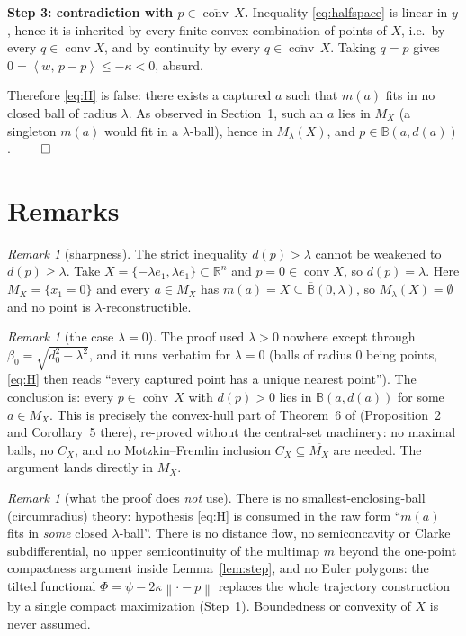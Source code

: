 \documentclass[11pt]{article}
\theoremstyle{remark}
\newtheorem{remark}[theorem]{Remark}
\newcommand{\R}{\mathbb{R}}
\newcommand{\B}{\mathbb{B}}
\newcommand{\X}{X}
\newcommand{\conv}{\operatorname{conv}}
\newcommand{\cconv}[1]{\overline{\conv}\,#1}
\newcommand{\sca}[2]{\left\langle #1,\, #2\right\rangle}
\newcommand{\norm}[1]{\left\lVert #1\right\rVert}
\newcommand{\Mx}{M_{\X}}
\newcommand{\Cx}{C_{\X}}
\newcommand{\Ml}{M_{\lambda}(\X)}
\newcommand{\Bcl}[2]{\overline{\B}(#1,#2)}
\begin{document}
\medskip
\noindent\textbf{Step 3: contradiction with $p\in\cconv\X$.}
Inequality \eqref{eq:halfspace} is linear in $y$, hence it is inherited by every finite convex
combination of points of $\X$, i.e.\ by every $q\in\conv\X$, and by continuity by every
$q\in\cconv\X$. Taking $q=p$ gives $0=\sca{w}{p-p}\le-\kappa<0$, absurd.

\medskip
Therefore \eqref{eq:H} is false: there exists a captured $a$ such that $m(a)$ fits in no closed
ball of radius $\lambda$. As observed in Section~1, such an $a$ lies in $\Mx$ (a singleton
$m(a)$ would fit in a $\lambda$-ball), hence in $\Ml$, and $p\in\B(a,d(a))$.
\hfill$\qed$

\section{Remarks}

\begin{remark}[sharpness]\label{rem:sharp}
The strict inequality $d(p)>\lambda$ cannot be weakened to $d(p)\ge\lambda$. Take
$\X=\{-\lambda e_1,\lambda e_1\}\subset\R^n$ and $p=0\in\conv\X$, so $d(p)=\lambda$. Here
$\Mx=\{x_1=0\}$ and every $a\in\Mx$ has $m(a)=\X\subseteq\Bcl{0}{\lambda}$, so
$\Ml=\emptyset$ and no point is $\lambda$-reconstructible.
\end{remark}

\begin{remark}[the case $\lambda=0$]
The proof used $\lambda>0$ nowhere except through $\beta_0=\sqrt{d_0^2-\lambda^2}$, and it runs
verbatim for $\lambda=0$ (balls of radius $0$ being points, \eqref{eq:H} then reads ``every
captured point has a unique nearest point''). The conclusion is: every $p\in\cconv\X$ with
$d(p)>0$ lies in $\B(a,d(a))$ for some $a\in\Mx$. This is precisely the convex-hull part of
Theorem~6 of \cite{Bia} (Proposition~2 and Corollary~5 there), re-proved without the central-set
machinery: no maximal balls, no $\Cx$, and no Motzkin--Fremlin inclusion
$\Cx\subseteq\overline{\Mx}$ are needed. The argument lands directly in $\Mx$.
\end{remark}

\begin{remark}[what the proof does \emph{not} use]
There is no smallest-enclosing-ball (circumradius) theory: hypothesis \eqref{eq:H} is consumed
in the raw form ``$m(a)$ fits in \emph{some} closed $\lambda$-ball''. There is no distance flow,
no semiconcavity or Clarke subdifferential, no upper semicontinuity of the multimap $m$ beyond
the one-point compactness argument inside Lemma~\ref{lem:step}, and no Euler polygons: the
tilted functional $\Phi=\psi-2\kappa\norm{\cdot-p}$ replaces the whole trajectory construction
by a single compact maximization (Step~1). Boundedness or convexity of $\X$ is never assumed.
\end{remark}
\end{document}
